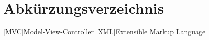 \chapter*{Abkürzungsverzeichnis}
\label{abkürzungsverzeichnis}


\begin{acronym}
	[MVC]{Model-View-Controller}
	[XML]{Extensible Markup Language}
\end{acronym}

